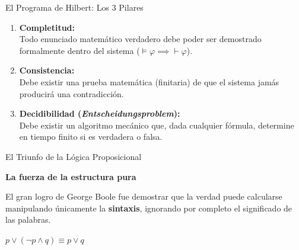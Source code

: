\documentclass[10pt, aspectratio=169]{beamer}
\begin{document}
\begin{frame}{El Programa de Hilbert: Los 3 Pilares}
    \normalsize
    \begin{enumerate}
        \setlength\itemsep{0.5cm}
        \item \alert{\textbf{Completitud:}} \\
        Todo enunciado matemático verdadero debe poder ser demostrado formalmente dentro del sistema ($\models \varphi \implies \vdash \varphi$).
        
        \item \alert{\textbf{Consistencia:}} \\
        Debe existir una prueba matemática (finitaria) de que el sistema jamás producirá una contradicción.
        
        \item \alert{\textbf{Decidibilidad (\textit{Entscheidungsproblem}):}} \\
        Debe existir un algoritmo mecánico que, dada cualquier fórmula, determine en tiempo finito si es verdadera o falsa.
    \end{enumerate}
\end{frame}

\begin{frame}{El Triunfo de la Lógica Proposicional}
    \begin{center}
        \Large \textbf{La fuerza de la estructura pura}
        
        \vspace{0.4cm}
        \normalsize
        El gran logro de George Boole fue demostrar que la verdad puede calcularse manipulando únicamente la \textbf{sintaxis}, ignorando por completo el significado de las palabras.
        
        \vspace{0.6cm}
        \huge
        $p \lor (\lnot p \land q) \equiv p \lor q$
        
        \vspace{0.6cm}
        \normalsize
    \end{center}
    
    \vspace{0.2cm}
\end{frame}
\end{document}

